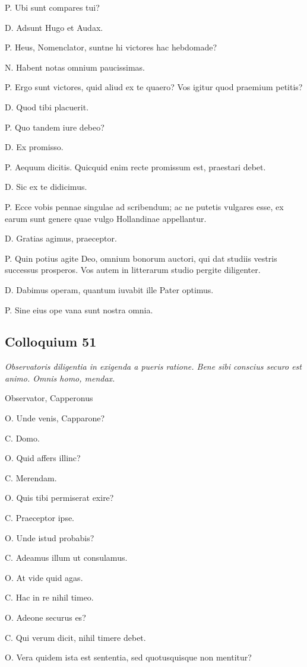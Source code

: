 \documentclass{article}
\begin{document}
P. Ubi sunt compares tui?

D. Adsunt Hugo et Audax.

P. Heus, Nomenclator, suntne hi victores hac hebdomade?

N. Habent notas omnium paucissimas.

P. Ergo sunt victores, quid aliud ex te quaero? Vos igitur quod praemium petitis?

D. Quod tibi placuerit.

P. Quo tandem iure debeo?

D. Ex promisso.

P. Aequum dicitis. Quicquid enim recte promissum est, praestari debet.

D. Sic ex te didicimus.

P. Ecce vobis pennae singulae ad scribendum; ac ne putetis vulgares esse, ex earum sunt genere quae vulgo Hollandinae appellantur.

D. Gratias agimus, praeceptor.

P. Quin potius agite Deo, omnium bonorum auctori, qui dat studiis vestris successus prosperos. Vos autem in litterarum studio pergite diligenter.

D. Dabimus operam, quantum iuvabit ille Pater optimus.

P. Sine eius ope vana sunt nostra omnia.

\subsection{Colloquium 51}
\emph{Observatoris diligentia in exigenda a pueris ratione. Bene sibi conscius securo est animo. Omnis homo, mendax.}

Observator, Capperonus

O. Unde venis, Capparone?

C. Domo.

O. Quid affers illinc?

C. Merendam.

O. Quis tibi permiserat exire?

C. Praeceptor ipse.

O. Unde istud probabis?

C. Adeamus illum ut consulamus.

O. At vide quid agas.

C. Hac in re nihil timeo.

O. Adeone securus es?

C. Qui verum dicit, nihil timere debet.

O. Vera quidem ista est sententia, sed quotusquisque non mentitur?
\end{document}
